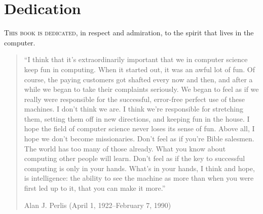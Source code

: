 \chapter*{Dedication}
\label{Dedication}

\lettrine{T}{his book is dedicated}, in respect and admiration, to the spirit that lives in the computer.

\begin{quote}
“I think that it’s extraordinarily important that we in computer science keep fun in computing.
When it started out, it was an awful lot of fun.
Of course, the paying customers got shafted every now and then, and after a while we began to take their complaints seriously.
We began to feel as if we really were responsible for the successful, error-free perfect use of these machines.
I don’t think we are.
I think we’re responsible for stretching them, setting them off in new directions, and keeping fun in the house.
I hope the field of computer science never loses its sense of fun.
Above all, I hope we don’t become missionaries.
Don’t feel as if you’re Bible salesmen.
The world has too many of those already.
What you know about computing other people will learn.
Don’t feel as if the key to successful computing is only in your hands.
What’s in your hands, I think and hope, is intelligence:
the ability to see the machine as more than when you were first led up to it, that you can make it more.”
\begin{flushleft}
	Alan J. Perlis (April 1, 1922--February 7, 1990)
\end{flushleft}
\end{quote}
